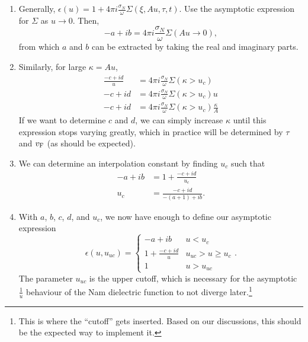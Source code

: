 \documentclass[../main.tex]{subfiles}
\begin{document}
	\begin{enumerate}
		\item Generally, $\epsilon(u) = 1 + 4 \pi i \frac{\sigma_N}{\omega} \Sigma(\xi, A u, \tau, t)$.
		Use the asymptotic expression for $\Sigma$ as $u \rightarrow 0$.
		Then,
		\begin{equation}
			-a + ib = 4 \pi i \frac{\sigma_N}{\omega} \Sigma(A u \rightarrow 0),
		\end{equation}
		from which $a$ and $b$ can be extracted by taking the real and imaginary parts.
		\item Similarly, for large $\kappa = A u$,
		\begin{align}
			\frac{-c + i d}{u} &= 4 \pi i \frac{\sigma_N}{\omega} \Sigma(\kappa > u_c) \\
			- c + i d &= 4 \pi i \frac{\sigma_N}{\omega} \Sigma(\kappa > u_c) u \\
			- c + i d &= 4 \pi i \frac{\sigma_N}{\omega} \Sigma(\kappa > u_c) \frac{\kappa}{A}
		\end{align}
		If we want to determine $c$ and $d$, we can simply increase $\kappa$ until this expression stops varying greatly, which in practice will be determined by $\tau$ and $v_{\mathrm{F}}$ (as should be expected).
		\item We can determine an interpolation constant by finding $u_c$ such that
		\begin{align}
			-a + ib &= 1 + \frac{-c + id}{u_c} \\
			u_c &= \frac{-c + id}{-(a + 1) + ib}.
		\end{align}
		\item With $a$, $b$, $c$, $d$, and $u_c$, we now have enough to define our asymptotic expression
		\begin{equation}
			\epsilon(u, u_{uc}) =
			\begin{cases}
				-a + i b & u < u_c \\
				1 + \frac{-c + i d}{u} &  u_{uc} > u \geq u_c \\
				1 & u > u_{uc}
			\end{cases}.
		\end{equation}
		The parameter $u_{uc}$ is the upper cutoff, which is necessary for the asymptotic $\frac{1}{u}$ behaviour of the Nam dielectric function to not diverge later.\footnote{
			This is where the ``cutoff'' gets inserted.
			Based on our discussions, this should be the expected way to implement it.
		}

	\end{enumerate}
\end{document}
